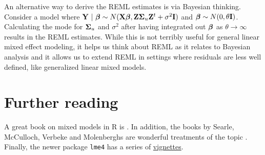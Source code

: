 An alternative way to derive the REML estimates is via Bayesian thinking. Consider a 
model where $\mathbf{Y} ~|~\boldsymbol{\beta} \sim N(\mathbf{X} \boldsymbol{\beta}, \mathbf{Z} \boldsymbol{\Sigma}_u \mathbf{Z}^t +\sigma^2 \mathbf{I})$ 
and $\boldsymbol{\beta} \sim N(0, \theta \mathbf{I})$. Calculating the mode for $\boldsymbol{\Sigma}_u$ and $\sigma^2$
after having integrated out $\boldsymbol{\beta}$ as $\theta \rightarrow \infty$ results in the REML estimates.
While this is not terribly useful for general linear mixed effect modeling, it helps us think
about REML as it relates to Bayesian analysis and it allows us to extend REML in settings
where residuals are less well defined, like generalized linear mixed models.

\section{Further reading}
A great book on mixed models in R is \cite{pinheiro2006mixed}. 
In addition, the books by Searle, McCulloch,
Verbeke and Molenberghs are  wonderful treatments of the topic
\citep{mcculloch2001linear,verbeke2009linear}. Finally, the
newer package \texttt{lme4} has a series of 
\href{https://cran.r-project.org/web/packages/lme4/index.html}{vignettes}.

